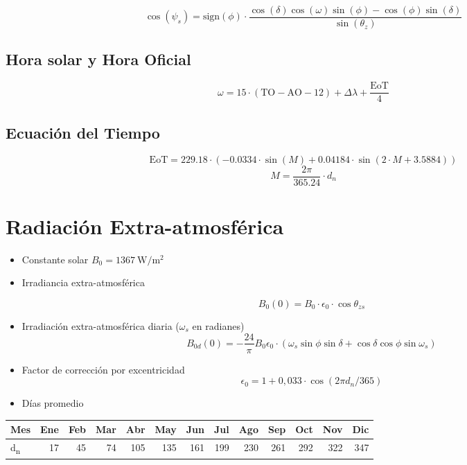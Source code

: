 \documentclass[article, a4paper]{memoir}
\begin{document}
\[
  \cos(\psi_{s}) = \mathrm{sign}(\phi) \cdot \frac{\cos(\delta) \cos(\omega) \sin(\phi) - \cos(\phi) \sin(\delta)} {\sin(\theta_{z})}
\]
\subsection{Hora solar y Hora Oficial}
\label{sec:org58cd1b4}

\[\omega=15\cdot(\mathrm{TO}-\mathrm{AO}-12)+\Delta\lambda+\frac{\mathrm{EoT}}{4}\]

\subsection{Ecuación del Tiempo}
\label{sec:orgae8ce3f}

\[
\mathrm{EoT}=229.18\cdot\left(-0.0334\cdot\sin(M)+0.04184\cdot\sin\left(2\cdot
      M+3.5884\right)\right)
\]
\[
M=\frac{2\pi}{365.24}\cdot d_{n}
\]



\section{Radiación Extra-atmosférica}
\label{sec:orgd62f467}

\begin{itemize}
\item Constante solar \(B_{0}=\SI{1367}{\watt\per\meter\squared}\)

\item Irradiancia extra-atmosférica

\[B_{0}(0)=B_{0}\cdot\epsilon_{0}\cdot\cos\theta_{zs}\]

\item Irradiación extra-atmosférica diaria  (\(\omega_{s}\) en radianes)
\[
  B_{0d}(0)=-\frac{24}{\pi}B_{0}\epsilon_{0}\cdot\left(\omega_{s}\sin\phi\sin\delta+\cos\delta\cos\phi\sin\omega_{s}\right)
\]

\item Factor de corrección por excentricidad
\[\epsilon_0 = 1+0,033\cdot\cos(2\pi d_n/365)\]
\end{itemize}


\begin{itemize}
\item Días promedio
\end{itemize}

\begin{center}
\begin{tabular}{lrrrrrrrrrrrr}
Mes & Ene & Feb & Mar & Abr & May & Jun & Jul & Ago & Sep & Oct & Nov & Dic\\
\hline
d\textsubscript{n} & 17 & 45 & 74 & 105 & 135 & 161 & 199 & 230 & 261 & 292 & 322 & 347\\
\end{tabular}
\end{center}
\end{document}
